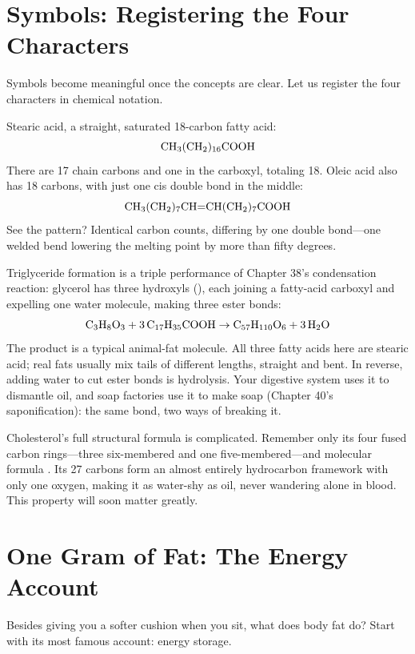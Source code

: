 \section{Symbols: Registering the Four Characters}

Symbols become meaningful once the concepts are clear. Let us register the four characters in chemical notation.

Stearic acid, a straight, saturated 18-carbon fatty acid:
\[\mathrm{CH_3(CH_2)_{16}COOH}\]
There are 17 chain carbons and one in the carboxyl, totaling 18. Oleic acid also has 18 carbons, with just one cis double bond in the middle:
\[\mathrm{CH_3(CH_2)_7CH{=}CH(CH_2)_7COOH}\]
See the pattern? Identical carbon counts, differing by one double bond---one welded bend lowering the melting point by more than fifty degrees.

Triglyceride formation is a triple performance of Chapter 38's condensation reaction: glycerol has three hydroxyls (), each joining a fatty-acid carboxyl and expelling one water molecule, making three ester bonds:
\[\mathrm{C_3H_8O_3} + 3\,\mathrm{C_{17}H_{35}COOH} \rightarrow \mathrm{C_{57}H_{110}O_6} + 3\,\mathrm{H_2O}\]
The product is a typical animal-fat molecule. All three fatty acids here are stearic acid; real fats usually mix tails of different lengths, straight and bent. In reverse, adding water to cut ester bonds is hydrolysis. Your digestive system uses it to dismantle oil, and soap factories use it to make soap (Chapter 40's saponification): the same bond, two ways of breaking it.

Cholesterol's full structural formula is complicated. Remember only its four fused carbon rings---three six-membered and one five-membered---and molecular formula . Its 27 carbons form an almost entirely hydrocarbon framework with only one oxygen, making it as water-shy as oil, never wandering alone in blood. This property will soon matter greatly.

\section{One Gram of Fat: The Energy Account}

Besides giving you a softer cushion when you sit, what does body fat do? Start with its most famous account: energy storage.


